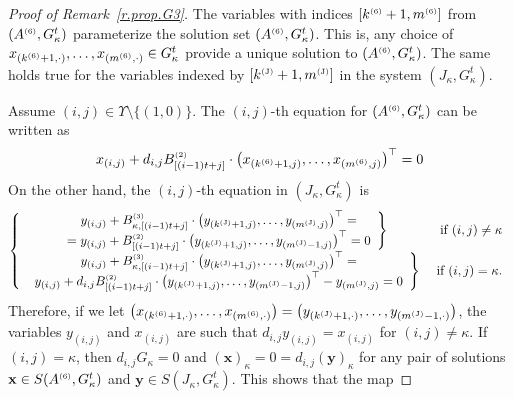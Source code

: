  \begin {proof} 
 [Proof of Remark~\ref {r.prop.G3}] The variables with indices $[k^{\text {\tiny {(6)}}}+1,m^{\text {\tiny {(6)}}}]$ from $(A^{\text {\tiny {(6)}}},G_{\kappa }^t)$ parameterize the solution set $(A^{\text {\tiny {(6)}}},G_{\kappa }^t)$. This is, any choice of $x_{(k^{\text {\tiny {(6)}}}+1,\cdot )},\ldots ,x_{(m^{\text {\tiny {(6)}}},\cdot )}\in G_{\kappa }^t$ provide a unique solution to $(A^{\text {\tiny {(6)}}},G_{\kappa }^t)$. The same holds true for the variables indexed by $[k^{\text {\tiny {(J)}}}+1,m^{\text {\tiny {(J)}}}]$ in the system $(J_{\kappa },G_\kappa ^t)$. \par Assume $(i,j)\in \Upsilon \setminus \{(1,0)\}$. The $(i,j)$-th equation for $(A^{\text {\tiny {(6)}}},G_{\kappa }^t)$ can be written as \begin {displaymath} x_{(i,j)}+d_{i,j} B_{[(i-1)t+j]}^{\text {\tiny {(2)}}}\cdot \left (x_{(k^{\text {\tiny {(6)}}}+1,j)},\ldots ,x_{(m^{\text {\tiny {(6)}}},j)}\right )^{\top }=0 \end {displaymath} On the other hand, the $(i,j)$-th equation in $(J_{\kappa },G_{\kappa }^t)$ is \begin {displaymath} \left \{\begin {array}{cr} \left .\begin {array}{c} y_{(i,j)} + B_{\kappa ,[(i-1)t+j]}^{\text {\tiny {(3)}}}\cdot \left (y_{(k^{\text {\tiny {(J)}}}+1,j)},\ldots ,y_{(m^{\text {\tiny {(J)}}},j)}\right )^{\top }= \\ =y_{(i,j)} + B_{[(i-1)t+j]}^{\text {\tiny {(2)}}}\cdot \left (y_{(k^{\text {\tiny {(J)}}}+1,j)},\ldots ,y_{(m^{\text {\tiny {(J)}}}-1,j)}\right )^{\top } =0 \end {array}\right \} & \text { if } (i,j)\neq \kappa \\ \par \left .\begin {array}{c} y_{(i,j)} + B_{\kappa ,[(i-1)t+j]}^{\text {\tiny {(3)}}}\cdot \left (y_{(k^{\text {\tiny {(J)}}}+1,j)},\ldots ,y_{(m^{\text {\tiny {(J)}}},j)}\right )^{\top }= \\ y_{(i,j)} + d_{i,j} B_{[(i-1)t+j]}^{\text {\tiny {(2)}}}\cdot \left (y_{(k^{\text {\tiny {(J)}}}+1,j)},\ldots ,y_{(m^{\text {\tiny {(J)}}}-1,j)}\right )^{\top }-y_{(m^{\text {\tiny {(J)}}},j)}=0 \end {array}\right \} & \text { if } (i,j)= \kappa . \\ \end {array}\right . \end {displaymath} Therefore, if we let $\left (x_{(k^{\text {\tiny {(6)}}}+1,\cdot )},\ldots ,x_{(m^{\text {\tiny {(6)}}},\cdot )}\right )=\left (y_{(k^{\text {\tiny {(J)}}}+1,\cdot )},\ldots ,y_{(m^{\text {\tiny {(J)}}}-1,\cdot )}\right )$, the variables $y_{(i,j)}$ and $x_{(i,j)}$ are such that $d_{i,j}y_{(i,j)}=x_{(i,j)}$ for $(i,j)\neq \kappa $. If $(i,j)=\kappa $, then $d_{i,j}G_{\kappa }=0$ and $(\mathbf {x})_{\kappa }=0=d_{i,j} (\mathbf {y})_{\kappa }$ for any pair of solutions $\mathbf {x}\in S(A^{\text {\tiny {(6)}}},G_{\kappa }^t)$ and $\mathbf {y}\in S(J_{\kappa },G_{\kappa }^t)$. This shows that the map 
\end{proof}
